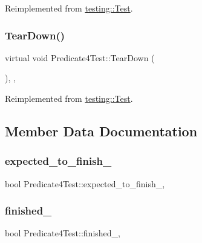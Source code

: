 Reimplemented from \mbox{\hyperlink{classtesting_1_1_test_a5f0ab439802cbe0ef7552f1a9f791923}{testing\+::\+Test}}.

\mbox{\label{class_predicate4_test_ab61983a4cdf3657b02bc2b81b67729c4}} 
\subsubsection{\texorpdfstring{TearDown()}{TearDown()}\hspace{0.1cm}{\footnotesize\ttfamily [3/3]}}
{\footnotesize\ttfamily virtual void Predicate4\+Test\+::\+Tear\+Down (\begin{DoxyParamCaption}{ }\end{DoxyParamCaption})\hspace{0.3cm}{\ttfamily [inline]}, {\ttfamily [protected]}, {\ttfamily [virtual]}}



Reimplemented from \mbox{\hyperlink{classtesting_1_1_test_a5f0ab439802cbe0ef7552f1a9f791923}{testing\+::\+Test}}.



\subsection{Member Data Documentation}
\mbox{\label{class_predicate4_test_a20600b5eda187c42ce4e812e77269654}} 
\subsubsection{\texorpdfstring{expected\_to\_finish\_}{expected\_to\_finish\_}}
{\footnotesize\ttfamily bool Predicate4\+Test\+::expected\+\_\+to\+\_\+finish\+\_\+\hspace{0.3cm}{\ttfamily [static]}, {\ttfamily [protected]}}

\mbox{\label{class_predicate4_test_acfd174bf9dfb5a91afbcdca17e797888}} 
\subsubsection{\texorpdfstring{finished\_}{finished\_}}
{\footnotesize\ttfamily bool Predicate4\+Test\+::finished\+\_\+\hspace{0.3cm}{\ttfamily [static]}, {\ttfamily [protected]}}

